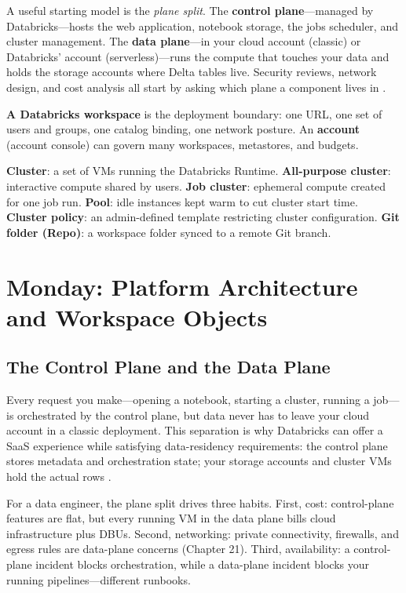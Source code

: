 A useful starting model is the \emph{plane split}. The \textbf{control plane}---managed by Databricks---hosts the web application, notebook storage, the jobs scheduler, and cluster management. The \textbf{data plane}---in your cloud account (classic) or Databricks' account (serverless)---runs the compute that touches your data and holds the storage accounts where Delta tables live. Security reviews, network design, and cost analysis all start by asking which plane a component lives in \cite{databricksWorkspace}.

\begin{definitionbox}
\textbf{A Databricks workspace} is the deployment boundary: one URL, one set of users and groups, one catalog binding, one network posture. An \textbf{account} (account console) can govern many workspaces, metastores, and budgets.
\end{definitionbox}

\begin{keyterms}
\textbf{Cluster}: a set of VMs running the Databricks Runtime. \textbf{All-purpose cluster}: interactive compute shared by users. \textbf{Job cluster}: ephemeral compute created for one job run. \textbf{Pool}: idle instances kept warm to cut cluster start time. \textbf{Cluster policy}: an admin-defined template restricting cluster configuration. \textbf{Git folder (Repo)}: a workspace folder synced to a remote Git branch.
\end{keyterms}

\section{Monday: Platform Architecture and Workspace Objects}
\subsection{The Control Plane and the Data Plane}
Every request you make---opening a notebook, starting a cluster, running a job---is orchestrated by the control plane, but data never has to leave your cloud account in a classic deployment. This separation is why Databricks can offer a SaaS experience while satisfying data-residency requirements: the control plane stores metadata and orchestration state; your storage accounts and cluster VMs hold the actual rows \cite{databricksSecurity}.

For a data engineer, the plane split drives three habits. First, cost: control-plane features are flat, but every running VM in the data plane bills cloud infrastructure plus DBUs. Second, networking: private connectivity, firewalls, and egress rules are data-plane concerns (Chapter 21). Third, availability: a control-plane incident blocks orchestration, while a data-plane incident blocks your running pipelines---different runbooks.

